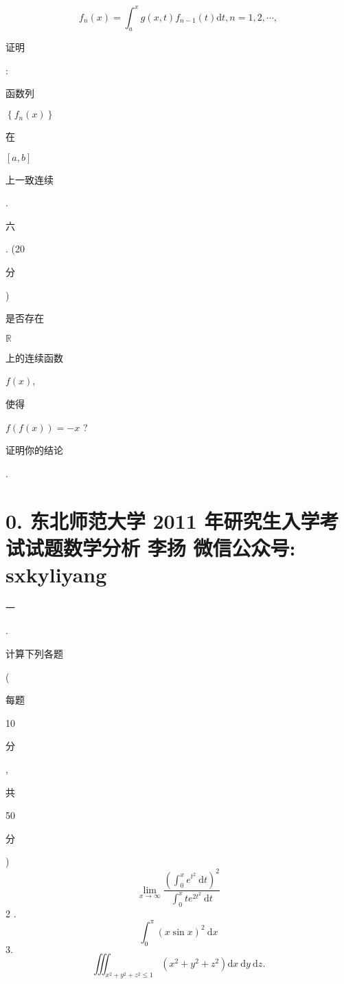 \documentclass[10pt]{article}
\begin{document}
$$
f_{n}(x)=\int_{a}^{x} g(x, t) f_{n-1}(t) \mathrm{d} t, n=1,2, \cdots,
$$
\begin{CJK}{UTF8}{mj}证明\end{CJK}: \begin{CJK}{UTF8}{mj}函数列\end{CJK} $\left\{f_{n}(x)\right\}$ \begin{CJK}{UTF8}{mj}在\end{CJK} $[a, b]$ \begin{CJK}{UTF8}{mj}上一致连续\end{CJK}.

\begin{CJK}{UTF8}{mj}六\end{CJK}. (20\begin{CJK}{UTF8}{mj}分\end{CJK}) \begin{CJK}{UTF8}{mj}是否存在\end{CJK} $\mathbb{R}$ \begin{CJK}{UTF8}{mj}上的连续函数\end{CJK} $f(x)$, \begin{CJK}{UTF8}{mj}使得\end{CJK} $f(f(x))=-x$ ? \begin{CJK}{UTF8}{mj}证明你的结论\end{CJK}.

\section{0. 东北师范大学 2011 年研究生入学考试试题数学分析 
 李扬 
 微信公众号: sxkyliyang}
\begin{CJK}{UTF8}{mj}一\end{CJK}. \begin{CJK}{UTF8}{mj}计算下列各题\end{CJK} (\begin{CJK}{UTF8}{mj}每题\end{CJK} 10 \begin{CJK}{UTF8}{mj}分\end{CJK}, \begin{CJK}{UTF8}{mj}共\end{CJK} 50 \begin{CJK}{UTF8}{mj}分\end{CJK})
$$
\lim _{x \rightarrow \infty} \frac{\left(\int_{0}^{x} e^{t^{2}} \mathrm{~d} t\right)^{2}}{\int_{0}^{x} t e^{2 t^{2}} \mathrm{~d} t}
$$
2 .
$$
\int_{0}^{\pi}(x \sin x)^{2} \mathrm{~d} x
$$
$3 .$
$$
\iiint_{x^{2}+y^{2}+z^{2} \leqslant 1}\left(x^{2}+y^{2}+z^{2}\right) \mathrm{d} x \mathrm{~d} y \mathrm{~d} z .
$$
\end{document}
